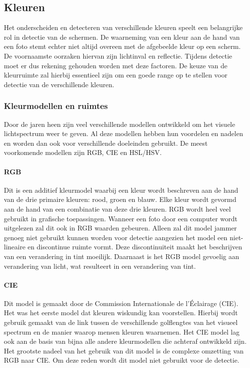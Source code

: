 
\subsection{Kleuren} \label{Kleuren}
Het onderscheiden en detecteren van verschillende kleuren speelt een belangrijke rol in detectie van de schermen. De waarneming van een kleur aan de hand van een foto stemt echter niet altijd overeen met de afgebeelde kleur op een scherm. De voornaamste oorzaken hiervan zijn lichtinval en reflectie. Tijdens detectie moet er dus rekening gehouden worden met deze factoren. De keuze van de kleurruimte zal hierbij essentieel zijn om een goede range op te stellen voor detectie van de verschillende kleuren.

\subsubsection{Kleurmodellen en ruimtes}
Door de jaren heen zijn veel verschillende modellen ontwikkeld om het visuele lichtspectrum weer te geven. Al deze modellen hebben hun voordelen en nadelen en worden dan ook voor verschillende doeleinden gebruikt. De meest voorkomende modellen zijn RGB, CIE en HSL/HSV.
\paragraph{RGB} Dit is een additief kleurmodel waarbij een kleur wordt beschreven aan de hand van de drie primaire kleuren: rood, groen en blauw. Elke kleur wordt gevormd aan de hand van een combinatie van deze drie kleuren. RGB wordt heel veel gebruikt in grafische toepassingen. Wanneer een foto door een computer wordt uitgelezen zal dit ook in RGB waarden gebeuren. Alleen zal dit model jammer genoeg niet gebruikt kunnen worden voor detectie aangezien het model een niet-lineaire en discontinue ruimte vormt. Deze discontinuiteit maakt het beschrijven van een verandering in tint moeilijk. Daarnaast is het RGB model gevoelig aan verandering van licht, wat resulteert in een verandering van tint. \paragraph{CIE} Dit model is gemaakt door de Commission Internationale de l'Éclairage (CIE). Het was het eerste model dat kleuren wiskundig kan voorstellen. Hierbij wordt gebruik gemaakt van de link tussen de verschillende golflengtes van het visueel spectrum en de manier waarop mensen kleuren waarnemen. Het CIE model lag ook aan de basis van bijna alle andere kleurmodellen die achteraf ontwikkeld zijn. Het grootste nadeel van het gebruik van dit model is de complexe omzetting van RGB naar CIE. Om deze reden wordt dit model niet gebruikt voor de detectie. 
